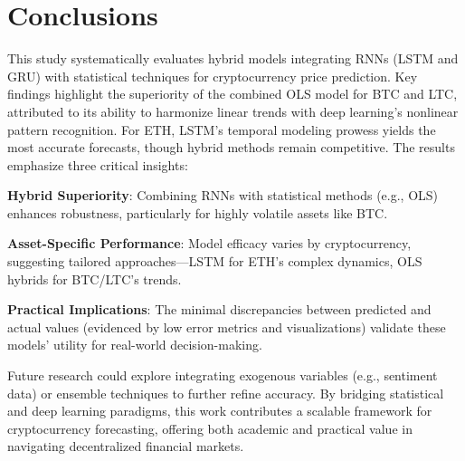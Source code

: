 \documentclass{dsfe}
\begin{document}
\section{Conclusions}
This study systematically evaluates hybrid models integrating RNNs (LSTM and GRU) with statistical techniques for cryptocurrency price prediction. Key findings highlight the superiority of the combined OLS model for BTC and LTC, attributed to its ability to harmonize linear trends with deep learning’s nonlinear pattern recognition. For ETH, LSTM’s temporal modeling prowess yields the most accurate forecasts, though hybrid methods remain competitive. The results emphasize three critical insights:

\textbf{Hybrid Superiority}: Combining RNNs with statistical methods (e.g., OLS) enhances robustness, particularly for highly volatile assets like BTC.

\textbf{Asset-Specific Performance}: Model efficacy varies by cryptocurrency, suggesting tailored approaches—LSTM for ETH’s complex dynamics, OLS hybrids for BTC/LTC’s trends.

\textbf{Practical Implications}: The minimal discrepancies between predicted and actual values (evidenced by low error metrics and visualizations) validate these models’ utility for real-world decision-making.

Future research could explore integrating exogenous variables (e.g., sentiment data) or ensemble techniques to further refine accuracy. By bridging statistical and deep learning paradigms, this work contributes a scalable framework for cryptocurrency forecasting, offering both academic and practical value in navigating decentralized financial markets.



\end{document}
